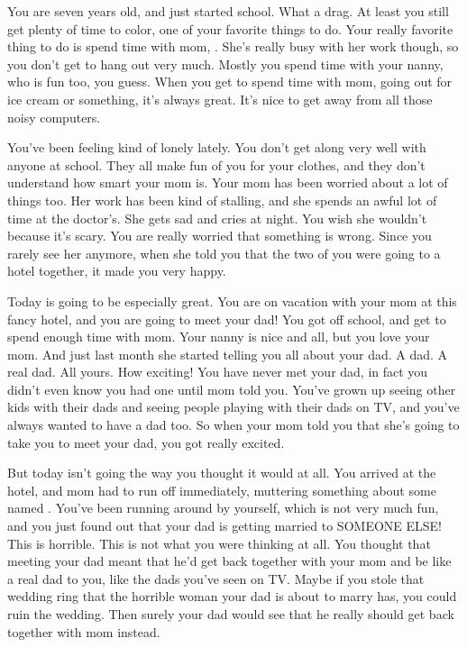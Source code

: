 \documentclass[char]{guildcamp1}
\begin{document}
\name{\cKid{}}

You are seven years old, and just started school. What a drag. At least you still get plenty of time to color, one of your favorite things to do. Your really favorite thing to do is spend time with mom, \cScientist{}. She's really busy with her work though, so you don't get to hang out very much. Mostly you spend time with your nanny, who is fun too, you guess. When you get to spend time with mom, going out for ice cream or something, it's always great. It's nice to get away from all those noisy computers.

You've been feeling kind of lonely lately. You don't get along very well with anyone at school. They all make fun of you for your clothes, and they don't understand how smart your mom is. Your mom has been worried about a lot of things too. Her work has been kind of stalling, and she spends an awful lot of time at the doctor's. She gets sad and cries at night. You wish she wouldn't because it's scary. You are really worried that something is wrong. Since you rarely see her anymore, when she told you that the two of you were going to a hotel together, it made you very happy.

Today is going to be especially great. You are on vacation with your mom at this fancy hotel, and you are going to meet your dad! You got off school, and get to spend enough time with mom. Your nanny is nice and all, but you love your mom. And just last month she started telling you all about your dad. A dad. A real dad. All yours. How exciting! You have never met your dad, in fact you didn't even know you had one until mom told you. You've grown up seeing other kids with their dads and seeing people playing with their dads on TV, and you've always wanted to have a dad too. So when your mom told you that she's going to take you to meet your dad, you got really excited.

But today isn't going the way you thought it would at all. You arrived at the hotel, and mom had to run off immediately, muttering something about some \cRival{\human} named \cRival{}. You've been running around by yourself, which is not very much fun, and you just found out that your dad is getting married to SOMEONE ELSE! This is horrible. This is not what you were thinking at all. You thought that meeting your dad meant that he'd get back together with your mom and be like a real dad to you, like the dads you've seen on TV. Maybe if you stole that wedding ring that the horrible woman your dad is about to marry has, you could ruin the wedding. Then surely your dad would see that he really should get back together with mom instead.
\end{document}
